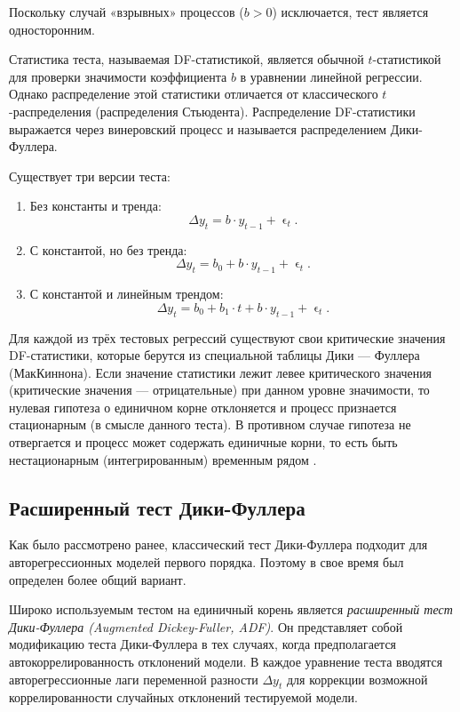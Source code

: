\documentclass[a4paper, 14pt]{extreport}
\numberwithin{equation}{section}
\renewcommand{\epsilon}{\upvarepsilon}
\numberwithin{equation}{section}
\begin{document}
	Поскольку случай «взрывных» процессов ($b > 0$) исключается, тест является односторонним.
	
	Статистика теста, называемая DF-статистикой, является обычной $t$-статистикой для проверки значимости коэффициента $b$ в уравнении линейной регрессии. Однако распределение этой статистики отличается от классического $t$-распределения (распределения Стьюдента).
	Распределение DF-статистики выражается через винеровский процесс и называется распределением Дики-Фуллера.
	
	Существует три версии теста:
	\begin{enumerate}
		\item Без константы и тренда:
		\begin{equation}
			\Delta y_t = b \cdot y_{t-1} + \epsilon_t.
		\end{equation}
		\item С константой, но без тренда:
		\begin{equation}
			\Delta y_t = b_0 + b \cdot y_{t-1} + \epsilon_t.
		\end{equation}
		\item С константой и линейным трендом:
		\begin{equation}
			\Delta y_t = b_0 + b_1 \cdot t + b \cdot y_{t-1} + \epsilon_t.
		\end{equation}
	\end{enumerate}
	
	Для каждой из трёх тестовых регрессий существуют свои критические значения DF-статистики, которые берутся из специальной таблицы Дики — Фуллера (МакКиннона). Если значение статистики лежит левее критического значения (критические значения — отрицательные) при данном уровне значимости, то нулевая гипотеза о единичном корне отклоняется и процесс признается стационарным (в смысле данного теста). В противном случае гипотеза не отвергается и процесс может содержать единичные корни, то есть быть нестационарным (интегрированным) временным рядом \cite{13}.
	
	
	\subsection{Расширенный тест Дики-Фуллера}
	\label{subsec:adf}
	Как было рассмотрено ранее, классический тест Дики-Фуллера подходит для авторегрессионных моделей первого порядка. Поэтому в свое время был определен более общий вариант.
	
	Широко используемым тестом на единичный корень является \textit{расширенный тест Дики-Фуллера (Augmented Dickey-Fuller, ADF)}. Он представляет собой модификацию теста Дики-Фуллера в тех случаях, когда
	предполагается автокоррелированность отклонений модели. В каждое уравнение
	теста вводятся авторегрессионные лаги переменной разности
	$\Delta y_t$
	для коррекции возможной коррелированности случайных отклонений
	тестируемой модели.
	
\end{document}
